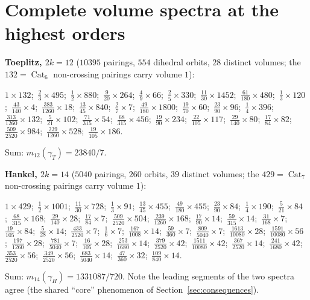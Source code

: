 ﻿\documentclass[11pt]{article}
\theoremstyle{remark}
\newcommand{\Cat}{\operatorname{Cat}}
\newcommand{\gT}{\gamma_T}
\newcommand{\gH}{\gamma_H}
\begin{document}
\appendix
\section{Complete volume spectra at the highest orders}\label{app:spectra}

\noindent\textbf{Toeplitz, $2k=12$} ($10395$ pairings, $554$ dihedral orbits, $28$
distinct volumes; the $132=\Cat_6$ non-crossing pairings carry volume $1$):
\begin{center}\small
$1\times132$;\ $\tfrac{2}{3}\times495$;\ $\tfrac{1}{2}\times880$;\
$\tfrac{9}{20}\times264$;\ $\tfrac{4}{9}\times66$;\ $\tfrac{2}{5}\times330$;\
$\tfrac{11}{30}\times1452$;\ $\tfrac{61}{180}\times480$;\ $\tfrac{1}{3}\times120$;\
$\tfrac{43}{140}\times4$;\ $\tfrac{383}{1260}\times18$;\ $\tfrac{13}{45}\times840$;\
$\tfrac{2}{7}\times7$;\ $\tfrac{49}{180}\times1800$;\ $\tfrac{19}{70}\times60$;\
$\tfrac{23}{90}\times96$;\ $\tfrac{1}{4}\times396$;\ $\tfrac{313}{1260}\times132$;\
$\tfrac{5}{21}\times102$;\ $\tfrac{71}{315}\times54$;\ $\tfrac{68}{315}\times456$;\
$\tfrac{19}{90}\times234$;\ $\tfrac{22}{105}\times117$;\ $\tfrac{29}{140}\times80$;\
$\tfrac{17}{84}\times82$;\ $\tfrac{509}{2520}\times984$;\
$\tfrac{239}{1260}\times528$;\ $\tfrac{19}{105}\times186$.
\end{center}
Sum: $m_{12}(\gT)=23840/7$.

\medskip
\noindent\textbf{Hankel, $2k=14$} ($5040$ pairings, $260$ orbits, $39$ distinct
volumes; the $429=\Cat_7$ non-crossing pairings carry volume $1$):
\begin{center}\small
$1\times429$;\ $\tfrac{1}{2}\times1001$;\ $\tfrac{11}{30}\times728$;\
$\tfrac{1}{3}\times91$;\ $\tfrac{13}{45}\times455$;\ $\tfrac{49}{180}\times455$;\
$\tfrac{23}{90}\times84$;\ $\tfrac{1}{4}\times190$;\ $\tfrac{5}{21}\times84$;\
$\tfrac{68}{315}\times168$;\ $\tfrac{29}{140}\times28$;\ $\tfrac{17}{84}\times7$;\
$\tfrac{509}{2520}\times504$;\ $\tfrac{239}{1260}\times168$;\
$\tfrac{17}{90}\times14$;\ $\tfrac{59}{315}\times14$;\ $\tfrac{31}{168}\times7$;\
$\tfrac{19}{105}\times84$;\ $\tfrac{5}{28}\times14$;\ $\tfrac{433}{2520}\times7$;\
$\tfrac{1}{6}\times7$;\ $\tfrac{167}{1008}\times14$;\ $\tfrac{59}{360}\times7$;\
$\tfrac{809}{5040}\times7$;\ $\tfrac{1613}{10080}\times28$;\
$\tfrac{1591}{10080}\times56$;\ $\tfrac{197}{1260}\times28$;\
$\tfrac{781}{5040}\times7$;\ $\tfrac{16}{105}\times28$;\
$\tfrac{253}{1680}\times14$;\ $\tfrac{379}{2520}\times42$;\
$\tfrac{1511}{10080}\times42$;\ $\tfrac{367}{2520}\times14$;\
$\tfrac{241}{1680}\times42$;\ $\tfrac{353}{2520}\times56$;\
$\tfrac{349}{2520}\times56$;\ $\tfrac{683}{5040}\times14$;\
$\tfrac{47}{360}\times32$;\ $\tfrac{109}{840}\times14$.
\end{center}
Sum: $m_{14}(\gH)=1331087/720$. Note the leading segments of the two spectra agree
(the shared ``core'' phenomenon of Section~\ref{sec:consequences}).
\end{document}
